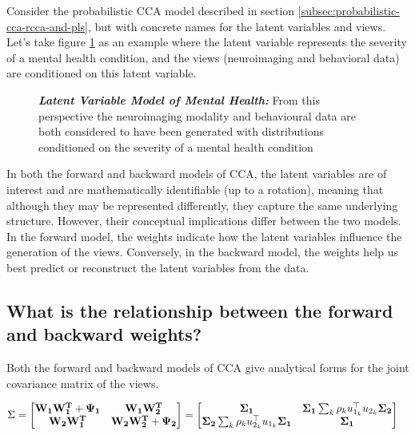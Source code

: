 Consider the probabilistic CCA model described in section \ref{subsec:probabilistic-cca-rcca-and-pls}, but with concrete names for the latent variables and views. Let's take figure \ref{fig:mentalhealthselfsupervised} as an example where the latent variable represents the severity of a mental health condition, and the views (neuroimaging and behavioral data) are conditioned on this latent variable.


\begin{figure}
    \centering
    \caption[Latent Variable Model of Mental Health]{\textit{\textbf{Latent Variable Model of Mental Health:}} From this perspective the neuroimaging modality and behavioural data are both considered to have been generated with distributions conditioned on the severity of a mental health condition}\label{fig:mentalhealthselfsupervised}
\end{figure}

In both the forward and backward models of CCA, the latent variables are of interest and are mathematically identifiable (up to a rotation), meaning that although they may be represented differently, they capture the same underlying structure. However, their conceptual implications differ between the two models. In the forward model, the weights indicate how the latent variables influence the generation of the views. Conversely, in the backward model, the weights help us best predict or reconstruct the latent variables from the data.

\subsection{What is the relationship between the forward and backward weights?}

Both the forward and backward models of CCA give analytical forms for the joint covariance matrix of the views.

\begin{align}
    \Sigma &= \begin{bmatrix}
        \bold{W_1W_1^T} + \bold{\Psi_1} & \bold{W_1W_2^T} \\
        \bold{W_2W_1^T} & \bold{W_2W_2^T} + \bold{\Psi_2}
    \end{bmatrix} = \begin{bmatrix}
        \bold{\Sigma_1} & \bold{\Sigma_1}\sum_k \rho_k u_{1_k}^\top u_{2_k} \bold{\Sigma_2}  \\
        \bold{\Sigma_2}\sum_k \rho_k u_{2_k}^\top u_{1_k} \bold{\Sigma_1} & \bold{\Sigma_1}
    \end{bmatrix}
\end{align}

